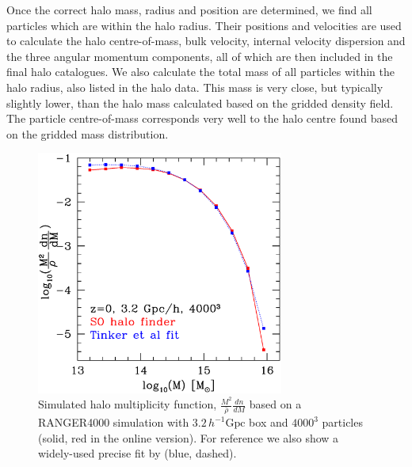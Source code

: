 Once the correct halo mass, radius and position are determined, we find all 
particles which are within the halo radius. Their positions and velocities are
used to calculate the halo centre-of-mass, bulk velocity, internal velocity 
dispersion and the three angular momentum components, all of which are then 
included in the final halo catalogues. We also calculate the total mass of
all particles within the halo radius, also listed in the halo data. This mass
is very close, but  typically slightly lower, than the halo mass calculated 
based on the gridded density field. The particle centre-of-mass corresponds 
very well to the halo centre found based on the gridded mass distribution. 


\begin{figure}%
  \begin{center}
    \includegraphics[width=3.2in]{graphs/mf_z0_Tinker.eps}
  \end{center}
  \caption{Simulated halo multiplicity function, 
    $\frac{M^2}{\bar{\rho}}\frac{dn}{dM}$ based on a
    RANGER4000 simulation with $3.2\,h^{-1} \mbox{Gpc}$ box and $4000^3$ 
    particles (solid, red in the online version). For reference we also show a widely-used 
    precise fit by \citet{2008ApJ...688..709T} (blue, dashed). 
    \label{mf}}
\end{figure}

